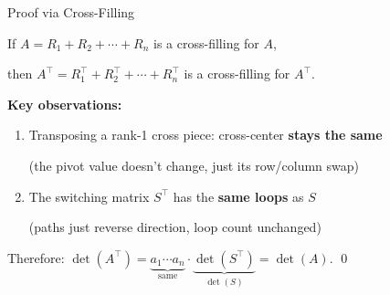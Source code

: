 \documentclass[10pt]{beamer}
\theoremstyle{definition}
\newcommand{\x}[1]{\alert{\textbf{#1}}}
\begin{document}
\begin{frame}{Proof via Cross-Filling}

If $A = R_1 + R_2 + \cdots + R_n$ is a cross-filling for $A$,

then $A^\top = R_1^\top + R_2^\top + \cdots + R_n^\top$ is a cross-filling for $A^\top$.

\vfill
\pause

\textbf{Key observations:}
\begin{enumerate}
\item Transposing a rank-1 cross piece: cross-center \x{stays the same}

(the pivot value doesn't change, just its row/column swap)

\vfill

\item The switching matrix $S^\top$ has the \x{same loops} as $S$

(paths just reverse direction, loop count unchanged)
\end{enumerate}

\vfill

Therefore: $\det(A^\top) = \underbrace{a_1 \cdots a_n}_{\text{same}} \cdot \underbrace{\det(S^\top)}_{\det(S)} = \det(A)$. \qed

\end{frame}
\end{document}
